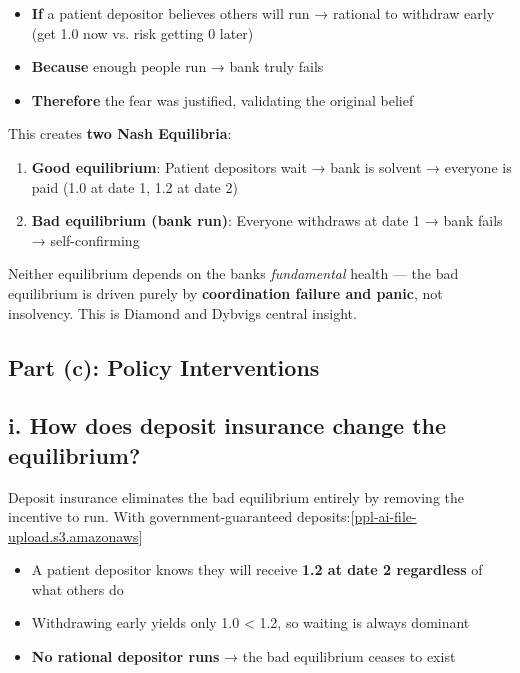 \documentclass[a4paper]{article}
\begin{document}
\begin{itemize}
\item
  \textbf{If} a patient depositor believes others will run → rational to
  withdraw early (get 1.0 now vs. risk getting 0 later)
\item
  \textbf{Because} enough people run → bank truly fails
\item
  \textbf{Therefore} the fear was justified, validating the original
  belief
\end{itemize}

This creates \textbf{two Nash Equilibria}:

\begin{enumerate}
\def\labelenumi{\arabic{enumi}.}
\item
  \textbf{Good equilibrium}: Patient depositors wait → bank is solvent →
  everyone is paid (1.0 at date 1, 1.2 at date 2)
\item
  \textbf{Bad equilibrium (bank run)}: Everyone withdraws at date 1 →
  bank fails → self-confirming
\end{enumerate}

Neither equilibrium depends on the bank\textquotesingle s
\emph{fundamental} health --- the bad equilibrium is driven purely by
\textbf{coordination failure and panic}, not insolvency. This is Diamond
and Dybvig\textquotesingle s central insight.

\hypertarget{part-c-policy-interventions}{%
\subsection{Part (c): Policy
Interventions}\label{part-c-policy-interventions}}

\hypertarget{i.-how-does-deposit-insurance-change-the-equilibrium}{%
\subsection{i. How does deposit insurance change the
equilibrium?}\label{i.-how-does-deposit-insurance-change-the-equilibrium}}

Deposit insurance eliminates the bad equilibrium entirely by removing
the incentive to run. With government-guaranteed
deposits:{[}\href{https://ppl-ai-file-upload.s3.amazonaws.com/web/direct-files/attachments/64012734/8ecdf432-f8fa-409d-b72d-017134eed977/Homework1.pdf}{ppl-ai-file-upload.s3.amazonaws}{]}\hspace{0pt}

\begin{itemize}
\item
  A patient depositor knows they will receive \textbf{1.2 at date 2
  regardless} of what others do
\item
  Withdrawing early yields only 1.0 \textless{} 1.2, so waiting is
  always dominant
\item
  \textbf{No rational depositor runs} → the bad equilibrium ceases to
  exist
\end{itemize}
\end{document}
